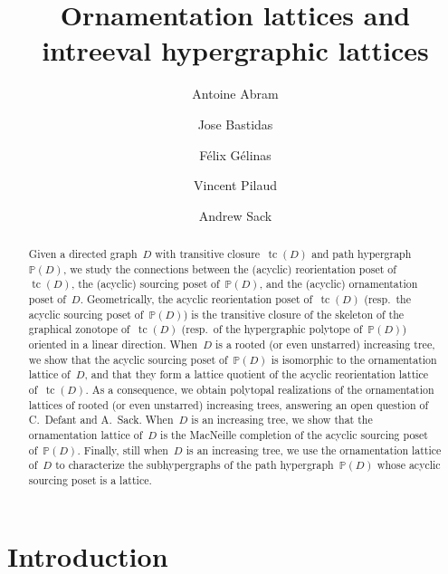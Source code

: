 \documentclass{amsart}
\title[Ornamentation lattices and intreeval hypergraphic lattices]{Ornamentation lattices and \\ intreeval hypergraphic lattices}
\author{Antoine Abram}
\author{Jose Bastidas}
\author{F\'elix G\'elinas}
\author{Vincent Pilaud}
\author{Andrew Sack}
\theoremstyle{definition}
\DeclareMathOperator{\tc}{tc} %
\newcommand{\PP}{\mathbb P} %
\begin{document}
\begin{abstract}
Given a directed graph~$D$ with transitive closure~$\tc(D)$ and path hypergraph~$\PP(D)$, we study the connections between the (acyclic) reorientation poset of~$\tc(D)$, the (acyclic) sourcing poset of~$\PP(D)$, and the (acyclic) ornamentation poset of~$D$.
Geometrically, the acyclic reorientation poset of~$\tc(D)$ (resp.~the acyclic sourcing poset of~$\PP(D)$) is the transitive closure of the skeleton of the graphical zonotope of~$\tc(D)$ (resp.~of the hypergraphic polytope of~$\PP(D)$) oriented in a linear direction.
When~$D$ is a rooted (or even unstarred) increasing tree, we show that the acyclic sourcing poset of~$\PP(D)$ is isomorphic to the ornamentation lattice of~$D$, and that they form a lattice quotient of the acyclic reorientation lattice of~$\tc(D)$.
As a consequence, we obtain polytopal realizations of the ornamentation lattices of rooted (or even unstarred) increasing trees, answering an open question of C.~Defant and A.~Sack.
When~$D$ is an increasing tree, we show that the ornamentation lattice of~$D$ is the MacNeille completion of the acyclic sourcing poset of~$\PP(D)$.
Finally, still when~$D$ is an increasing tree, we use the ornamentation lattice of~$D$ to characterize the subhypergraphs of the path hypergraph~$\PP(D)$ whose acyclic sourcing poset is a lattice.
\end{abstract}

\vspace*{-1cm}
\maketitle

\tableofcontents
\vspace*{-1cm}


\section{Introduction}
\label{sec:introduction}

\end{document}
